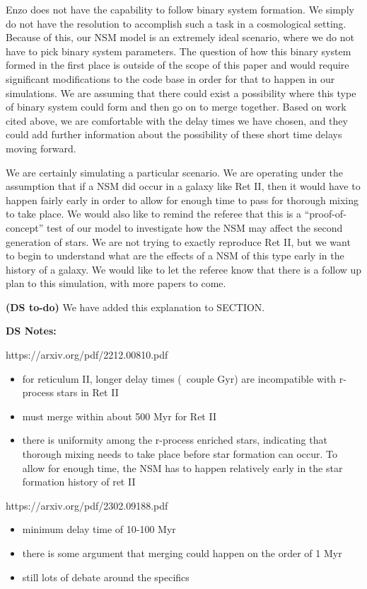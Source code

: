 \documentclass[11pt]{article}
\begin{document}
Enzo does not have the capability to follow binary system formation. We simply do not have the resolution to accomplish such a task in a cosmological setting. Because of this, our NSM model is an extremely ideal scenario, where we do not have to pick binary system parameters. The question of how this binary system formed in the first place is outside of the scope of this paper and would require significant modifications to the code base in order for that to happen in our simulations. We are assuming that there could exist a possibility where this type of binary system could form and then go on to merge together. Based on work cited above, we are comfortable with the delay times we have chosen, and they could add further information about the possibility of these short time delays moving forward.

We are certainly simulating a particular scenario. We are operating under the assumption that if a NSM did occur in a galaxy like Ret II, then it would have to happen fairly early in order to allow for enough time to pass for thorough mixing to take place. We would also like to remind the referee that this is a ``proof-of-concept'' test of our model to investigate how the NSM may affect the second generation of stars. We are not trying to exactly reproduce Ret II, but we want to begin to understand what are the effects of a NSM of this type early in the history of a galaxy. We would like to let the referee know that there is a follow up plan to this simulation, with more papers to come.

\textbf{(DS to-do)} We have added this explanation to SECTION.

\textbf{DS Notes:}

https://arxiv.org/pdf/2212.00810.pdf
\begin{itemize}
    \item for reticulum II, longer delay times (~couple Gyr) are incompatible with r-process stars in Ret II
    \item must merge within about 500 Myr for Ret II
    \item there is uniformity among the r-process enriched stars, indicating that thorough mixing needs to take place before star formation can occur. To allow for enough time, the NSM has to happen relatively early in the star formation history of ret II
\end{itemize}

https://arxiv.org/pdf/2302.09188.pdf
\begin{itemize}
    \item minimum delay time of 10-100 Myr
    \item there is some argument that merging could happen on the order of 1 Myr
    \item still lots of debate around the specifics
\end{itemize}
\end{document}
